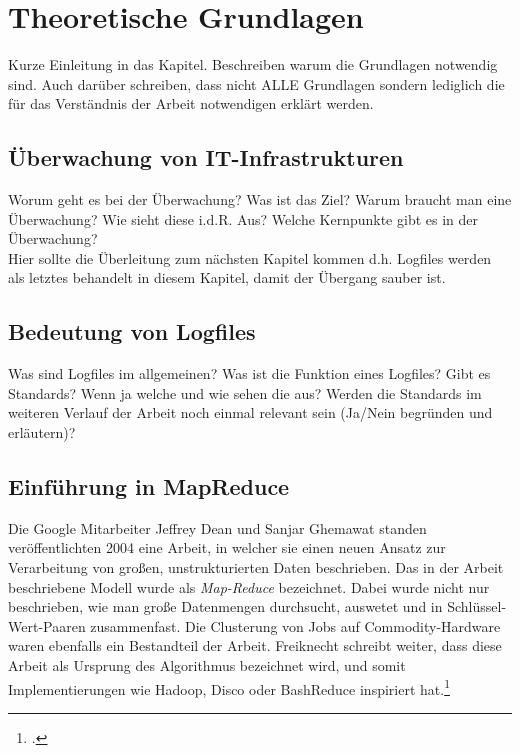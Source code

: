 
\chapter{Theoretische Grundlagen}\label{cha:Grundlagen}
Kurze Einleitung in das Kapitel. Beschreiben warum die Grundlagen notwendig sind. Auch darüber schreiben, dass nicht ALLE Grundlagen sondern lediglich die für das Verständnis der Arbeit notwendigen erklärt werden.

\section{Überwachung von IT-Infrastrukturen}\label{sec:UeberwachungIT}
Worum geht es bei der Überwachung? Was ist das Ziel? Warum braucht man eine Überwachung? Wie sieht diese i.d.R. Aus? Welche Kernpunkte gibt es in der Überwachung? \\
Hier sollte die Überleitung zum nächsten Kapitel kommen d.h. Logfiles werden als letztes behandelt in diesem Kapitel, damit der Übergang sauber ist.

\section{Bedeutung von Logfiles}\label{sec:BedeutungVonLogfiles}
Was sind Logfiles im allgemeinen? Was ist die Funktion eines Logfiles? Gibt es Standards? Wenn ja welche und wie sehen die aus? Werden die Standards im weiteren Verlauf der Arbeit noch einmal relevant sein (Ja/Nein begründen und erläutern)?

\section{Einführung in MapReduce}\label{sec:EinführungInMapReduce}
Die Google Mitarbeiter Jeffrey Dean und Sanjar Ghemawat standen veröffentlichten 2004 eine Arbeit, in welcher sie einen neuen Ansatz zur Verarbeitung von großen, unstrukturierten Daten beschrieben. Das in der Arbeit beschriebene Modell wurde als \textit{Map-Reduce} bezeichnet. Dabei wurde nicht nur beschrieben, wie man große Datenmengen durchsucht, auswetet und in Schlüssel-Wert-Paaren zusammenfast. Die Clusterung von Jobs auf \gls{Commodity-Hardware} waren ebenfalls ein Bestandteil der Arbeit. Freiknecht schreibt weiter, dass diese Arbeit als Ursprung des Algorithmus bezeichnet wird, und somit Implementierungen wie Hadoop, Disco oder BashReduce inspiriert hat.\footcite[Vgl.][S. 42]{Freiknecht.2014}


